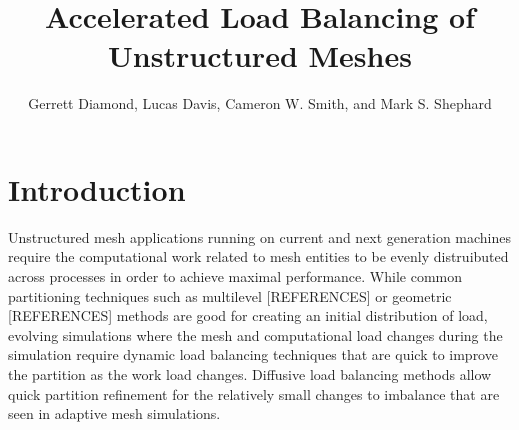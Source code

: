 \documentclass[graybox]{svmult}
\begin{document}
\title*{Accelerated Load Balancing of Unstructured Meshes}
\author{
Gerrett Diamond,
Lucas Davis,
Cameron W. Smith,
and Mark S. Shephard
}

\maketitle


\section{Introduction} \label{sec:intro}


Unstructured mesh applications running on current and next generation machines require the
computational work related to mesh entities to be evenly distruibuted across processes in
order to achieve maximal performance. While common partitioning techniques such as multilevel
[REFERENCES] or geometric [REFERENCES] methods are good for creating an initial distribution
of load, evolving simulations where the mesh and computational load changes during the
simulation require dynamic load balancing techniques that are quick to improve the partition
as the work load changes. Diffusive load balancing methods allow quick partition refinement
for the relatively small changes to imbalance that are seen in adaptive mesh simulations.
\end{document}
